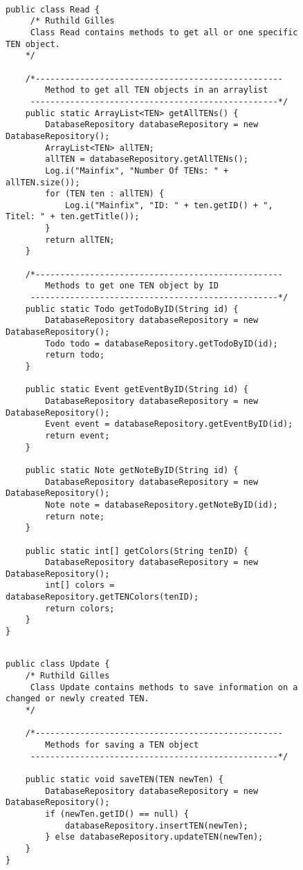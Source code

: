 \begin{figure}[H]
\begin{lstlisting}[caption=Read Klasse (Ruthild Gilles)]

public class Read {
     /* Ruthild Gilles
     Class Read contains methods to get all or one specific TEN object.
    */

    /*--------------------------------------------------
        Method to get all TEN objects in an arraylist
     --------------------------------------------------*/
    public static ArrayList<TEN> getAllTENs() {
        DatabaseRepository databaseRepository = new DatabaseRepository();
        ArrayList<TEN> allTEN;
        allTEN = databaseRepository.getAllTENs();
        Log.i("Mainfix", "Number Of TENs: " + allTEN.size());
        for (TEN ten : allTEN) {
            Log.i("Mainfix", "ID: " + ten.getID() + ", Titel: " + ten.getTitle());
        }
        return allTEN;
    }

    /*--------------------------------------------------
        Methods to get one TEN object by ID
     --------------------------------------------------*/
    public static Todo getTodoByID(String id) {
        DatabaseRepository databaseRepository = new DatabaseRepository();
        Todo todo = databaseRepository.getTodoByID(id);
        return todo;
    }

    public static Event getEventByID(String id) {
        DatabaseRepository databaseRepository = new DatabaseRepository();
        Event event = databaseRepository.getEventByID(id);
        return event;
    }

    public static Note getNoteByID(String id) {
        DatabaseRepository databaseRepository = new DatabaseRepository();
        Note note = databaseRepository.getNoteByID(id);
        return note;
    }

    public static int[] getColors(String tenID) {
        DatabaseRepository databaseRepository = new DatabaseRepository();
        int[] colors = databaseRepository.getTENColors(tenID);
        return colors;
    }
}
\end{lstlisting}
\end{figure}

\begin{figure}[H]
\begin{lstlisting}[caption=Update Klasse (Ruthild Gilles)]

public class Update {
    /* Ruthild Gilles
     Class Update contains methods to save information on a changed or newly created TEN.
    */

    /*--------------------------------------------------
        Methods for saving a TEN object
     --------------------------------------------------*/

    public static void saveTEN(TEN newTen) {
        DatabaseRepository databaseRepository = new DatabaseRepository();
        if (newTen.getID() == null) {
            databaseRepository.insertTEN(newTen);
        } else databaseRepository.updateTEN(newTen);
    }
}
\end{lstlisting}
\end{figure}

